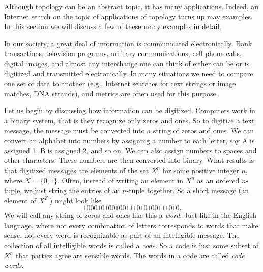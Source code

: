 \label{sec:metric_applications}


\vspace*{-17 pt}
\framebox{\hspace*{3 pt}
\parbox{4.7 in}{\begin{fqs}
\item 

\end{fqs}} \hspace*{3 pt}}

\vspace*{13 pt}


Although topology can be an abstract topic, it has many applications. Indeed, an Internet search on the topic of applications of topology turns up may examples. In this section we will discuss a few of these many examples in detail.


 In our society, a great deal of information is communicated electronically. Bank transactions, television programs, military communications, cell phone calls, digital images, and almost any interchange one can think of either can be or is digitized and transmitted electronically. In many situations we need to compare one set of data to another (e.g., Internet searches for text strings or image matches, DNA strands), and metrics are often used for this purpose. 
 
Let us begin by discussing how information can be digitized. Computers work in a binary system, that is they recognize only zeros and ones. So to digitize a text message, the message must be converted into a string of zeros and ones. We can convert an alphabet into numbers by assigning a number to each letter, say A is assigned 1, B is assigned 2, and so on. We can also assign numbers to spaces and other characters. These numbers are then converted into binary. What results is that digitized messages are elements of the set $X^n$ for some positive integer $n$, where $X = \{0,1\}$. Often, instead of writing an element in $X^n$ as an ordered $n$-tuple, we just string the entries of an $n$-tuple together. So a short message (an element of $X^{27}$) might look like 
\[100010100100111010100111010.\]
We will call any string of zeros and ones like this a \emph{word}. Just like in the English language, where not every combination of letters corresponds to words that make sense, not every word is recognizable as part of an intelligible message. The collection of all intelligible words is called a \emph{code}. So a code is just some subset of $X^n$ that parties agree are sensible words. The words in a code are called \emph{code words}. 

